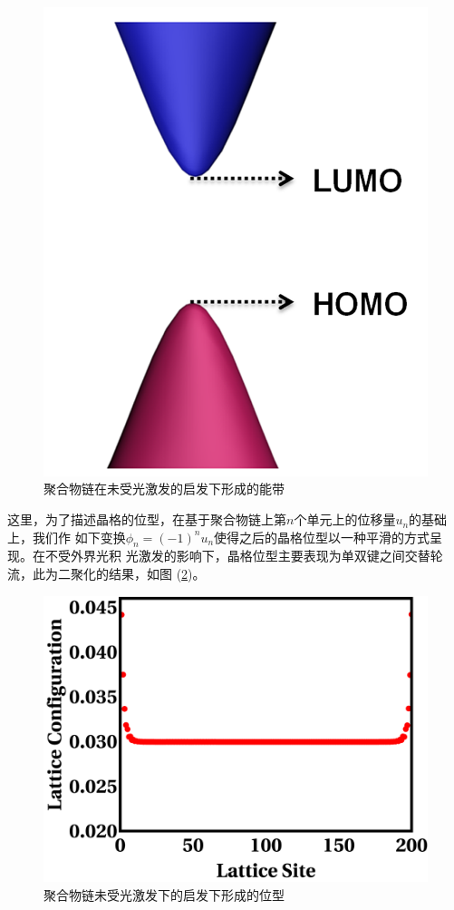 \documentclass[12pt,]{report}
\begin{document}
\begin{figure}[h!] 
    \centering
    \includegraphics[scale=1]{./figures/Exciton_Figure_1.png}
    \caption{聚合物链在未受光激发的启发下形成的能带}
    \label{fig:unexcited}
\end{figure}

这里，为了描述晶格的位型，在基于聚合物链上第\(n\)个单元上的位移量\(u_n\)的基础上，我们作
如下变换\(\phi_n = (-1)^n u_n\)使得之后的晶格位型以一种平滑的方式呈现。在不受外界光积
光激发的影响下，晶格位型主要表现为单双键之间交替轮流，此为二聚化的结果，如图
(\ref{fig:config})。

\begin{figure}[h!] 
    \centering
    \includegraphics[scale=1]{./figures/Exciton_Figure_2.png}
    \caption{聚合物链未受光激发下的启发下形成的位型}
    \label{fig:config}
\end{figure}
\end{document}
